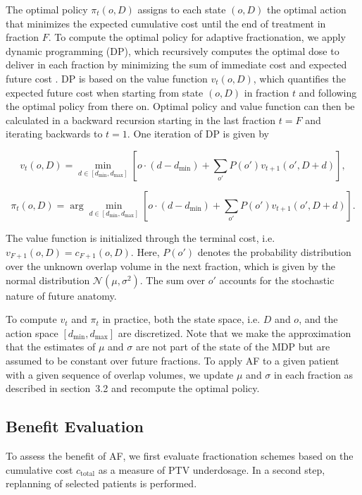 \documentclass[11pt]{article}
\begin{document}
The optimal policy $\pi_t(o,D)$ assigns to each state $(o,D)$ the optimal action that minimizes the expected cumulative cost until the end of treatment in fraction $F$. To compute the optimal policy for adaptive fractionation, we apply dynamic programming (DP), which recursively computes the optimal dose to deliver in each fraction by minimizing the sum of immediate cost and expected future cost \cite{ref14}. DP is based on the value function $v_t(o,D)$, which quantifies the expected future cost when starting from state $(o,D)$ in fraction $t$ and following the optimal policy from there on. Optimal policy and value function can then be calculated in a backward recursion starting in the last fraction $t=F$ and iterating backwards to $t=1$. One iteration of DP is given by

\begin{equation}
v_t(o,D) = \min_{d \in [d_{\min}, d_{\max}]}\left[o\cdot(d-d_{\min}) + \sum_{o'} P(o') v_{t+1}(o', D+d)\right],
\label{eq:value-overlap}
\end{equation}

\begin{equation}
\pi_t(o,D) = \arg\min_{d \in [d_{\min}, d_{\max}]}\left[o\cdot(d-d_{\min}) + \sum_{o'} P(o') v_{t+1}(o', D+d)\right].
\label{eq:policy-overlap}
\end{equation}

The value function is initialized through the terminal cost, i.e. $v_{F+1}(o,D)=c_{F+1}(o,D)$. Here, $P(o')$ denotes the probability distribution over the unknown overlap volume in the next fraction, which is given by the normal distribution $\mathcal{N}(\mu,\sigma^2)$. The sum over $o'$ accounts for the stochastic nature of future anatomy.

To compute $v_t$ and $\pi_t$ in practice, both the state space, i.e. $D$ and $o$, and the action space $[d_{\min}, d_{\max}]$ are discretized. Note that we make the approximation that the estimates of $\mu$ and $\sigma$ are not part of the state of the MDP but are assumed to be constant over future fractions. To apply AF to a given patient with a given sequence of overlap volumes, we update $\mu$ and $\sigma$ in each fraction as described in section~3.2 and recompute the optimal policy.

\subsection{Benefit Evaluation}

To assess the benefit of AF, we first evaluate fractionation schemes based on the cumulative cost $c_{\mathrm{total}}$ as a measure of PTV underdosage. In a second step, replanning of selected patients is performed.
\end{document}
